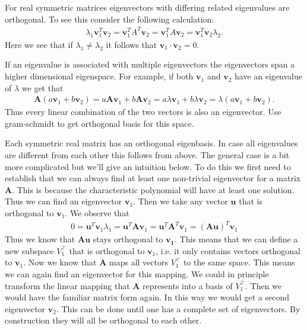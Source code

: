 For real symmetric matrices eigenvectors with differing related eigenvalues are orthogonal.
To see this consider the following calculation:
\begin{align}
    \lambda_{1} \bm{v}_1^T \bm{v}_2 = \bm{v}_1^T A^T \bm{v}_2 = \bm{v}_1^T A \bm{v}_2 = \bm{v}_1^T \bm{v}_2 \lambda_{2}.
\end{align}
Here we see that if $\lambda_{1} \neq \lambda_{2}$ it follows that $\bm{v}_1 \cdot \bm{v}_2 = 0$.

If an eigenvalue is associated with multiple eigenvectors the eigenvectors span a higher dimensional eigenspace. For example, if both 
$\bm{v}_1$ and $\bm{v}_2$ have an eigenvalue of $\lambda$ we get that
\begin{align}
    \bm{A}(a\bm{v}_1+b\bm{v}_2)=a\bm{A}\bm{v}_1+ b \bm{A}\bm{v}_2=a\lambda\bm{v}_1+b\lambda\bm{v}_2= \lambda(a\bm{v}_1+b\bm{v}_2).
\end{align}
Thus every linear combination of the two vectors is also an eigenvector.    
Use gram-schmidt to get orthogonal basis for this space.

Each symmetric real matrix has an orthogonal eigenbasis. 
In case all eigenvalues are different from each other this follows from above.
The general case is a bit more complicated but we'll give an intuition below.
To do this we first need to establish that we can always find at least one non-trivial eigenvector 
for a matrix $\bm{A}$. This is because the characteristic polynomial will have at least one solution.
Thus we can find an eigenvector $\bm{v}_1$. Then we take any vector $\bm{u}$ that is orthogonal to $\bm{v}_1$.
We observe that 
\begin{align}
   0 = \bm{u}^T\bm{v}_1 \lambda_1 = \bm{u}^T\bm{Av}_1  = \bm{u}^T\bm{A}^T\bm{v}_1  = (\bm{A}\bm{u})^T\bm{v}_1
\end{align}
Thus we know that $\bm{Au}$ stays orthogonal to $\bm{v_1}$.
This means that we can define a new subspace $V_1^\top$ that is orthogonal to $\bm{v}_1$, i.e. it only contains vectors orthogonal 
to $\bm{v}_1$. 
Now we know that $\bm{A}$ maps all vectors $V_1^\top$ to the same space.
This means we can again find an eigenvector for this mapping. 
We could in principle transform the linear mapping that $\bm{A}$ represents into a basis of $V_1^\top$.
Then we would have the familiar matrix form again. 
In this way we would get a second eigenvector $\bm{v}_2$. 
This can be done until one has a complete set of eigenvectors. By construction they will all be orthogonal to each other.



